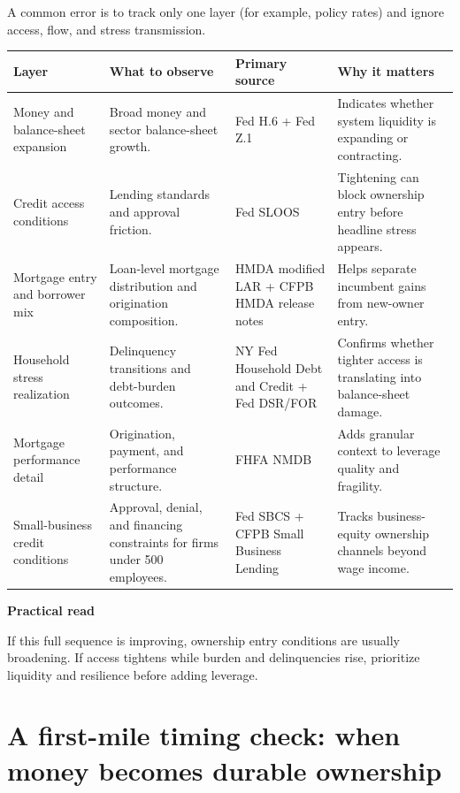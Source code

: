 \documentclass[11pt,openany]{book}
\begin{document}
A common error is to track only one layer (for example, policy rates) and ignore access, flow, and stress transmission.

\begin{center}
\small
\begin{tabularx}{\textwidth}{>{\raggedright\arraybackslash}p{}>{\raggedright\arraybackslash}p{}>{\raggedright\arraybackslash}p{}X}
\toprule
\textbf{Layer} & \textbf{What to observe} & \textbf{Primary source} & \textbf{Why it matters} \\
\midrule
Money and balance-sheet expansion & Broad money and sector balance-sheet growth. & Fed H.6 + Fed Z.1 & Indicates whether system liquidity is expanding or contracting. \\
Credit access conditions & Lending standards and approval friction. & Fed SLOOS & Tightening can block ownership entry before headline stress appears. \\
Mortgage entry and borrower mix & Loan-level mortgage distribution and origination composition. & HMDA modified LAR + CFPB HMDA release notes & Helps separate incumbent gains from new-owner entry. \\
Household stress realization & Delinquency transitions and debt-burden outcomes. & NY Fed Household Debt and Credit + Fed DSR/FOR & Confirms whether tighter access is translating into balance-sheet damage. \\
Mortgage performance detail & Origination, payment, and performance structure. & FHFA NMDB & Adds granular context to leverage quality and fragility. \\
Small-business credit conditions & Approval, denial, and financing constraints for firms under 500 employees. & Fed SBCS + CFPB Small Business Lending & Tracks business-equity ownership channels beyond wage income. \\
\bottomrule
\end{tabularx}
\normalsize
\end{center}

\begin{notebox}
\textbf{Practical read}\par
If this full sequence is improving, ownership entry conditions are usually broadening. If access tightens while burden and delinquencies rise, prioritize liquidity and resilience before adding leverage.
\end{notebox}

\section{A first-mile timing check: when money becomes durable ownership}
\end{document}
